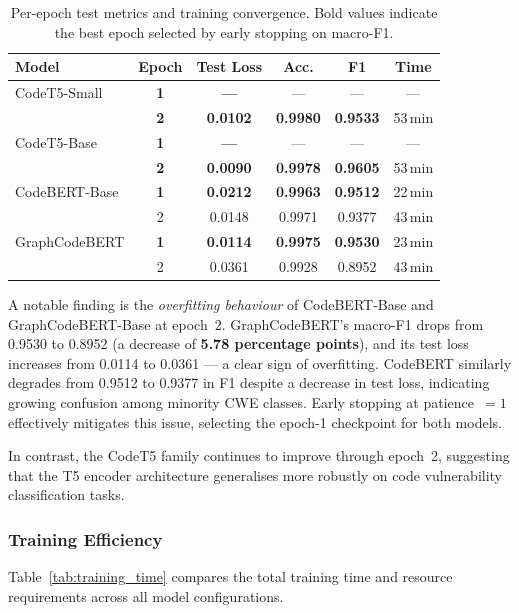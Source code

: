 \documentclass[conference]{IEEEtran}
\begin{document}
\begin{table}[t]
\centering
\caption{Per-epoch test metrics and training convergence.  Bold values
         indicate the best epoch selected by early stopping on macro-F1.}
\label{tab:convergence}
\begin{tabular}{lccccc}
\hline
\textbf{Model} & \textbf{Epoch} & \textbf{Test Loss} & \textbf{Acc.} & \textbf{F1} & \textbf{Time} \\
\hline
CodeT5-Small      & \textbf{1} & \textbf{---}  & ---   & ---   & ---  \\
                  & \textbf{2} & \textbf{0.0102} & \textbf{0.9980} & \textbf{0.9533} & 53\,min \\
\hline
CodeT5-Base       & \textbf{1} & \textbf{---}  & ---   & ---   & ---  \\
                  & \textbf{2} & \textbf{0.0090} & \textbf{0.9978} & \textbf{0.9605} & 53\,min \\
\hline
CodeBERT-Base     & \textbf{1} & \textbf{0.0212} & \textbf{0.9963} & \textbf{0.9512} & 22\,min \\
                  & 2 & 0.0148 & 0.9971 & 0.9377 & 43\,min \\
\hline
GraphCodeBERT     & \textbf{1} & \textbf{0.0114} & \textbf{0.9975} & \textbf{0.9530} & 23\,min \\
                  & 2 & 0.0361 & 0.9928 & 0.8952 & 43\,min \\
\hline
\end{tabular}
\end{table}

A notable finding is the \emph{overfitting behaviour} of CodeBERT-Base and
GraphCodeBERT-Base at epoch~2.  GraphCodeBERT's macro-F1 drops from
0.9530 to 0.8952 (a decrease of \textbf{5.78 percentage points}), and its
test loss increases from 0.0114 to 0.0361 --- a clear sign of overfitting.
CodeBERT similarly degrades from 0.9512 to 0.9377 in F1 despite a decrease
in test loss, indicating growing confusion among minority CWE classes.
Early stopping at patience~$= 1$ effectively mitigates this issue,
selecting the epoch-1 checkpoint for both models.

In contrast, the CodeT5 family continues to improve through epoch~2,
suggesting that the T5 encoder architecture generalises more robustly on
code vulnerability classification tasks.

\subsubsection{Training Efficiency}
Table~\ref{tab:training_time} compares the total training time and
resource requirements across all model configurations.
\end{document}
